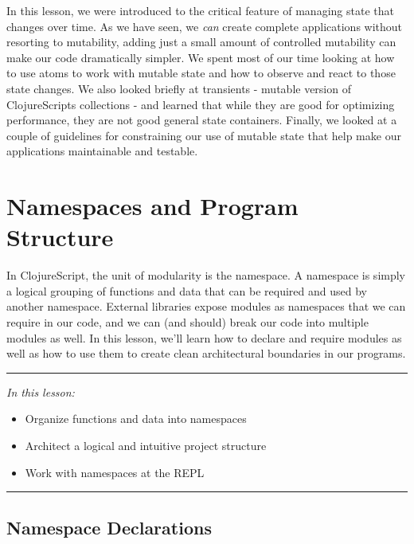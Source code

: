 \documentclass[10pt,twoside,openright]{memoir}
\begin{document}
In this lesson, we were introduced to the critical feature of managing
state that changes over time. As we have seen, we \emph{can} create
complete applications without resorting to mutability, adding just a
small amount of controlled mutability can make our code dramatically
simpler. We spent most of our time looking at how to use atoms to work
with mutable state and how to observe and react to those state changes.
We also looked briefly at transients - mutable version of ClojureScripts
collections - and learned that while they are good for optimizing
performance, they are not good general state containers. Finally, we
looked at a couple of guidelines for constraining our use of mutable
state that help make our applications maintainable and testable.

\chapter{Namespaces and Program Structure}

In ClojureScript, the unit of modularity is the namespace. A namespace
is simply a logical grouping of functions and data that can be required
and used by another namespace. External libraries expose modules as
namespaces that we can require in our code, and we can (and should)
break our code into multiple modules as well. In this lesson, we'll
learn how to declare and require modules as well as how to use them to
create clean architectural boundaries in our programs.

\begin{center}\rule{0.5\linewidth}{0.5pt}\end{center}

\emph{In this lesson:}

\begin{itemize}
\tightlist
\item
  Organize functions and data into namespaces
\item
  Architect a logical and intuitive project structure
\item
  Work with namespaces at the REPL
\end{itemize}

\begin{center}\rule{0.5\linewidth}{0.5pt}\end{center}

\section{Namespace Declarations}
\end{document}

